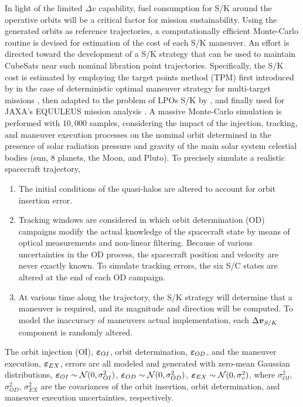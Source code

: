 In light of the limited $\Delta v$ capability, fuel consumption for S/K around the operative orbits will be a critical factor for mission sustainability. Using the generated orbits as reference trajectories, a computationally efficient Monte-Carlo routine is devised for estimation of the cost of each S/K maneuver. An effort is directed toward the development of a S/K strategy that can be used to maintain CubeSats near  such nominal libration point trajectories. Specifically, the S/K cost is estimated by employing the target points method (TPM) first introduced by \citeauthor{dwivedi1975} in the case of deterministic optimal maneuver strategy for multi-target missions \cite{dwivedi1975}, then adapted to the problem of LPOs S/K by \textcite{howell1993stationkeeping}, and finally used for JAXA's EQUULEUS mission analysis \cite{kenshiro2017equuleus}. A massive Monte-Carlo simulation is performed with $10,000$ samples, considering the impact of the injection, tracking, and maneuver execution processes on the nominal orbit determined in the presence of solar radiation pressure and gravity of the main solar system celestial bodies (\ie sun, $8$ planets, the Moon, and Pluto). To precisely simulate a realistic spacecraft trajectory,
%
\begin{enumerate}
	\item The initial conditions of the quasi-halos are altered to account for orbit insertion error.
	\item Tracking windows are considered in which orbit determination (OD) campaigns modify the actual knowledge of the spacecraft state by means of optical measurements and non-linear filtering. Because of various uncertainties in the {OD} process, the spacecraft position and velocity are never exactly known. To simulate tracking errors, the six S/C states are altered at the end of each {OD} campaign.
	\item At various time along the trajectory, the S/K strategy will determine that a maneuver is required, and its magnitude and direction will be computed. To model the inaccuracy of maneuvers actual implementation, each $\Delta\boldsymbol{v}_{S/K}$ component is randomly altered.
\end{enumerate}
%
The orbit injection (OI), $\boldsymbol{\varepsilon}_{OI}$, orbit determination, $\boldsymbol{\varepsilon}_{OD}$, and the maneuver execution, $\boldsymbol{\varepsilon}_{EX}$, errors are all modeled and generated with zero-mean Gaussian distributions, \ie $\boldsymbol{\varepsilon}_{OI}\sim\mathcal{N}(0,\sigma_{OI}^2)$, $\boldsymbol{\varepsilon}_{OD}\sim\mathcal{N}(0,\sigma_{OD}^2)$, $\boldsymbol{\varepsilon}_{EX}\sim\mathcal{N}(0,\sigma_{v}^2)$, where $\sigma_{OI}^2$, $\sigma_{OD}^2$, $\sigma_{EX}^2$ are the covariances of the orbit insertion, orbit determination, and maneuver execution uncertainties, respectively.

